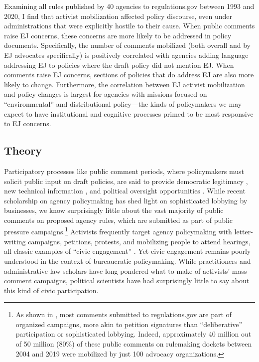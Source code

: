 \documentclass[
      12pt,
        ]{article}
\begin{document}
Examining all rules published by 40 agencies to regulations.gov between 1993 and 2020, I find that activist mobilization affected policy discourse, even under administrations that were explicitly hostile to their cause. When public comments raise
EJ concerns, these concerns are more likely to be
addressed in policy documents. Specifically, the number of comments mobilized (both overall and by EJ advocates specifically) is positively correlated with agencies adding language addressing EJ to policies where the draft policy did not mention EJ. When comments raise EJ concerns, sections of policies that do address EJ are also more likely to change.
Furthermore, the correlation between EJ activist mobilization and policy changes is largest for agencies with missions focused on ``environmental'' and distributional policy---the kinds of policymakers we may expect to have institutional and cognitive processes primed to be most responsive to EJ concerns.

\hypertarget{theory}{%
\subsection{Theory}\label{theory}}

Participatory processes like public comment periods, where policymakers must solicit public input on draft policies, are said to provide democratic legitimacy \citep{Croley2003, Rosenbloom2003}, new technical information \citep{Yackee2006JPART, Nelson2012}, and political oversight opportunities \citep{Balla1998, Mccubbins1984}. While recent scholarship on agency policymaking has shed light on sophisticated lobbying by businesses, we know surprisingly little about the vast majority of public comments on proposed agency rules, which are submitted as part of public pressure campaigns.\footnote{
  As shown in \citet{judgelord2019SPSA}, most comments submitted to
  regulations.gov are part of organized campaigns, more akin to petition signatures than ``deliberative'' participation or sophisticated lobbying. Indeed, approximately 40 million out of
  50 million (80\%) of these public comments on rulemaking dockets between 2004 and 2019 were mobilized by just 100
  advocacy organizations.}
Activists frequently target agency policymaking with letter-writing campaigns, petitions, protests,
and mobilizing people to attend hearings, all classic examples of ``civic engagement'' \citep{Verba1987}. Yet civic engagement remains poorly understood in the context of bureaucratic policymaking.
While practitioners and administrative law scholars have long pondered
what to make of activists' mass comment campaigns, political scientists have had
surprisingly little to say about this kind of civic participation.
\end{document}
